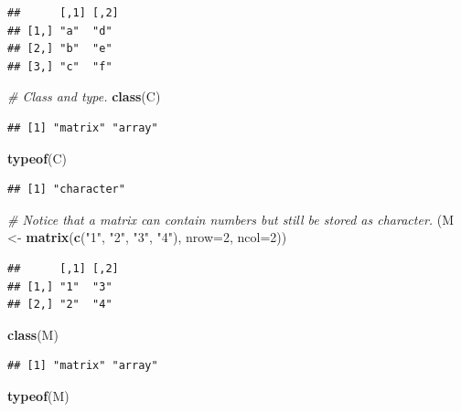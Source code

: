 \documentclass[
]{book}
\newenvironment{Shaded}{\begin{snugshade}}{\end{snugshade}}
\newcommand{\AttributeTok}[1]{\textcolor[rgb]{0.13,0.29,0.53}{#1}}
\newcommand{\CommentTok}[1]{\textcolor[rgb]{0.56,0.35,0.01}{\textit{#1}}}
\newcommand{\DecValTok}[1]{\textcolor[rgb]{0.00,0.00,0.81}{#1}}
\newcommand{\FunctionTok}[1]{\textcolor[rgb]{0.13,0.29,0.53}{\textbf{#1}}}
\newcommand{\NormalTok}[1]{#1}
\newcommand{\OtherTok}[1]{\textcolor[rgb]{0.56,0.35,0.01}{#1}}
\newcommand{\StringTok}[1]{\textcolor[rgb]{0.31,0.60,0.02}{#1}}
\begin{document}
\begin{verbatim}
##      [,1] [,2]
## [1,] "a"  "d" 
## [2,] "b"  "e" 
## [3,] "c"  "f"
\end{verbatim}

\begin{Shaded}
\begin{Highlighting}[]
\CommentTok{\# Class and type.}
\FunctionTok{class}\NormalTok{(C)}
\end{Highlighting}
\end{Shaded}

\begin{verbatim}
## [1] "matrix" "array"
\end{verbatim}

\begin{Shaded}
\begin{Highlighting}[]
\FunctionTok{typeof}\NormalTok{(C)}
\end{Highlighting}
\end{Shaded}

\begin{verbatim}
## [1] "character"
\end{verbatim}

\begin{Shaded}
\begin{Highlighting}[]
\CommentTok{\# Notice that a matrix can contain numbers but still be stored as character.}
\NormalTok{(M }\OtherTok{\textless{}{-}} \FunctionTok{matrix}\NormalTok{(}\FunctionTok{c}\NormalTok{(}\StringTok{"1"}\NormalTok{, }\StringTok{"2"}\NormalTok{, }\StringTok{"3"}\NormalTok{, }\StringTok{"4"}\NormalTok{), }\AttributeTok{nrow=}\DecValTok{2}\NormalTok{, }\AttributeTok{ncol=}\DecValTok{2}\NormalTok{))}
\end{Highlighting}
\end{Shaded}

\begin{verbatim}
##      [,1] [,2]
## [1,] "1"  "3" 
## [2,] "2"  "4"
\end{verbatim}

\begin{Shaded}
\begin{Highlighting}[]
\FunctionTok{class}\NormalTok{(M)}
\end{Highlighting}
\end{Shaded}

\begin{verbatim}
## [1] "matrix" "array"
\end{verbatim}

\begin{Shaded}
\begin{Highlighting}[]
\FunctionTok{typeof}\NormalTok{(M)}
\end{Highlighting}
\end{Shaded}
\end{document}
